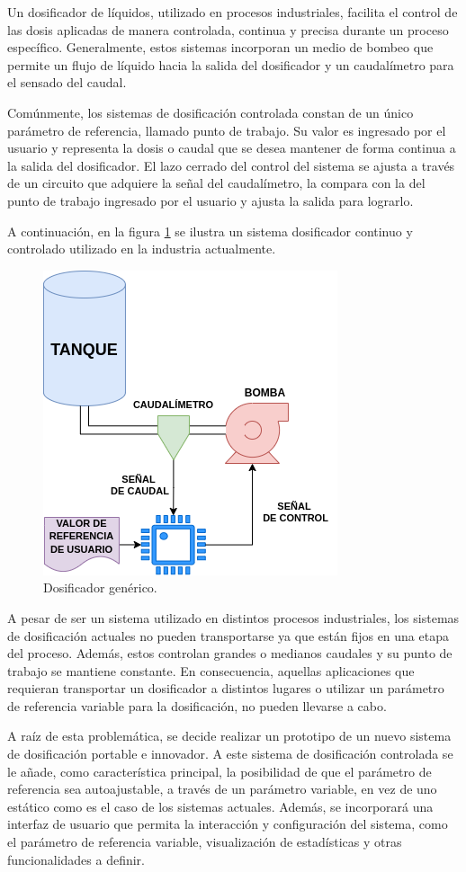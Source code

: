\documentclass[
11pt, %
]{charter}
\begin{document}
Un dosificador de líquidos, utilizado en procesos industriales, facilita el control de las dosis aplicadas de manera controlada, continua y precisa durante un proceso específico. Generalmente, estos sistemas incorporan un medio de bombeo que permite un flujo de líquido hacia la salida del dosificador y un caudalímetro para el sensado del caudal.

Comúnmente, los sistemas de dosificación controlada constan de un único parámetro de referencia, llamado punto de trabajo. Su valor es ingresado por el usuario y representa la dosis o caudal que se desea mantener de forma continua a la salida del dosificador. El lazo cerrado del control del sistema se ajusta a través de un circuito que adquiere la señal del caudalímetro, la compara con la del punto de trabajo ingresado por el usuario y ajusta la salida para lograrlo.

A continuación, en la figura \ref{fig:diagCaudalimetroGenerico} se ilustra un sistema dosificador continuo y controlado utilizado en la industria actualmente.

\begin{figure}[htpb]
\centering 
\includegraphics[width=.45\textwidth]{./Figuras/diagCaudalimetroGenerico.png}
\caption{Dosificador genérico.}
\label{fig:diagCaudalimetroGenerico}
\end{figure}

A pesar de ser un sistema utilizado en distintos procesos industriales, los sistemas de dosificación actuales no pueden transportarse ya que están fijos en una etapa del proceso. Además, estos controlan grandes o medianos caudales y su punto de trabajo se mantiene constante. En consecuencia, aquellas aplicaciones que requieran transportar un dosificador a distintos lugares o utilizar un parámetro de referencia variable para la dosificación, no pueden llevarse a cabo.

A raíz de esta problemática, se decide realizar un prototipo de un nuevo sistema de dosificación portable e innovador. A este sistema de dosificación controlada se le añade, como característica principal, la posibilidad de que el parámetro de referencia sea autoajustable, a través de un parámetro variable, en vez de uno estático como es el caso de los sistemas actuales. Además, se incorporará una interfaz de usuario que permita la interacción y configuración del sistema, como el parámetro de referencia variable, visualización de estadísticas y otras funcionalidades a definir. 
\end{document}
